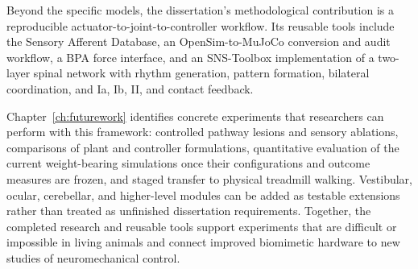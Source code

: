 \begin{reviewchange}
Beyond the specific models, the dissertation's methodological contribution is a reproducible actuator-to-joint-to-controller workflow. Its reusable tools include the Sensory Afferent Database, an OpenSim-to-MuJoCo conversion and audit workflow, a BPA force interface, and an SNS-Toolbox implementation of a two-layer spinal network with rhythm generation, pattern formation, bilateral coordination, and Ia, Ib, II, and contact feedback.

Chapter~\ref{ch:futurework} identifies concrete experiments that researchers can perform with this framework: controlled pathway lesions and sensory ablations, comparisons of plant and controller formulations, quantitative evaluation of the current weight-bearing simulations once their configurations and outcome measures are frozen, and staged transfer to physical treadmill walking. Vestibular, ocular, cerebellar, and higher-level modules can be added as testable extensions rather than treated as unfinished dissertation requirements. Together, the completed research and reusable tools support experiments that are difficult or impossible in living animals and connect improved biomimetic hardware to new studies of neuromechanical control.
\end{reviewchange}
